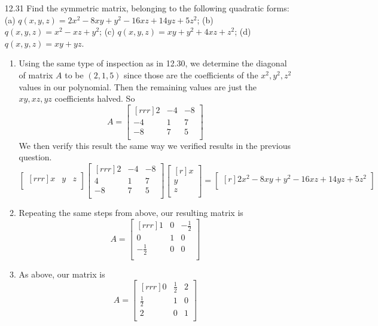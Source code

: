 \documentclass[12pt]{article}
\theoremstyle{definition}
\theoremstyle{plain}
\begin{document}
\begin{enumerate}
\begin{enumerate}
	\end{enumerate}		
\item[12.31]Find the symmetric matrix, belonging to the following quadratic forms:\\
(a) $q(x,y,z)=2x^2-8xy+y^2-16xz+14yz+5z^2$; (b) $q(x,y,z)=x^2-xz+y^2$; (c) $q(x,y,z)=xy+y^2+4xz+z^2$; (d) $q(x,y,z)=xy+yz$.
	\begin{enumerate}
	\item Using the same type of inspection as in 12.30, we determine the diagonal of matrix $A$ to be $(2,1,5)$ since those are the coefficients of the $x^2,y^2,z^2$ values in our polynomial. Then the remaining values are just the $xy,xz,yz$ coefficients halved. So
	\[ A=\begin{bmatrix}[rrr]2&-4&-8\\-4&1&7\\-8&7&5\\\end{bmatrix} \]
	We then verify this result the same way we verified results in the previous question.
	\[ \begin{bmatrix}[rrr]x&y&z\\\end{bmatrix}\begin{bmatrix}[rrr]2&-4&-8\\4&1&7\\-8&7&5\\\end{bmatrix}\begin{bmatrix}[r]x\\y\\z\\\end{bmatrix} = \begin{bmatrix}[r]2x^2-8xy+y^2-16xz+14yz+5z^2\\\end{bmatrix}\]
	\item Repeating the same steps from above, our resulting matrix is
	\[ A=\begin{bmatrix}[rrr]1&0&-\frac{1}{2}\\0&1&0\\-\frac{1}{2}&0&0\\\end{bmatrix} \]
	\item As above, our matrix is
	\[ A=\begin{bmatrix}[rrr]0&\frac{1}{2}&2\\\frac{1}{2}&1&0\\2&0&1\\\end{bmatrix} \]

\end{enumerate}
\end{enumerate}
\end{document}
